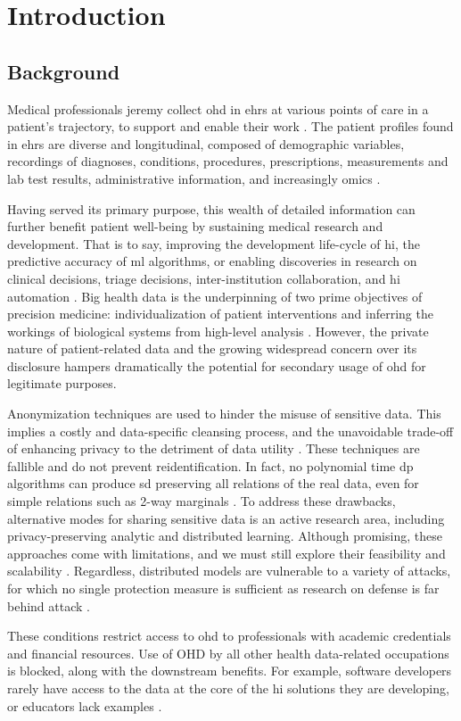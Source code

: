 \glsresetall
\section{Introduction}
    \subsection{Background}
        Medical professionals jeremy collect \gls{ohd} in \glspl{ehr} at various points of care in a patient’s trajectory, to support and enable their work \cite{Cowie_2016}. The patient profiles found in \glspl{ehr} are diverse and longitudinal, composed of demographic variables, recordings of diagnoses, conditions, procedures, prescriptions, measurements and lab test results, administrative information, and increasingly omics \cite{Ohdsi2020-vf}.\par
        Having served its primary purpose, this wealth of detailed information can further benefit patient well-being by sustaining medical research and development. That is to say, improving the development life-cycle of \gls{hi}, the predictive accuracy of \gls{ml} algorithms, or enabling discoveries in research on clinical decisions, triage decisions, inter-institution collaboration, and \gls{hi} automation \cite{Rudin_2020, Rankin2020}. Big health data is the underpinning of two prime objectives of precision medicine: individualization of patient interventions and inferring the workings of biological systems from high-level analysis \cite{Capobianco2020}. However, the private nature of patient-related data and the growing widespread concern over its disclosure hampers dramatically the potential for secondary usage of \gls{ohd} for legitimate purposes.\par
        Anonymization techniques are used to hinder the misuse of sensitive data. This implies a costly and data-specific cleansing process, and the unavoidable trade-off of enhancing privacy to the detriment of data utility \cite{Dankar2012-bd, Cheu2019-vh, De_Cristofaro2020-tl}. These techniques are fallible and do not prevent reidentification. In fact, no polynomial time \gls{dp} algorithms can produce \gls{sd} preserving all relations of the real data, even for simple relations such as 2-way marginals \cite{Ullman2011}. To address these drawbacks, alternative modes for sharing sensitive data is an active research area, including privacy-preserving analytic and distributed learning. Although promising, these approaches come with limitations, and we must still explore their feasibility and scalability \cite{Raisaro2018-gv}. Regardless, distributed models are vulnerable to a variety of attacks, for which no single protection measure is sufficient as research on defense is far behind attack \cite{enthoven2020overview, Gao2020, Luo2020-gq, Lyu2020-sv}.\par
        These conditions restrict access to \gls{ohd} to professionals with academic credentials and financial resources. Use of OHD by all other health data-related occupations is blocked, along with the downstream benefits. For example, software developers rarely have access to the data at the core of the \gls{hi} solutions they are developing, or educators lack examples \cite{laderas_teaching_2018}.
        
